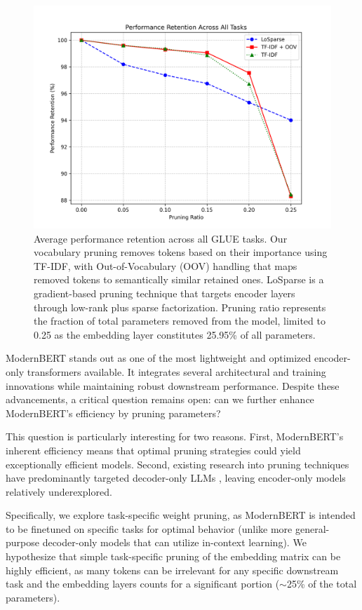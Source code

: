 \documentclass[twocolumn]{article}
\begin{document}
\begin{figure}[t]
\centering
\includegraphics[width=\columnwidth]{images/performance_retention.png}
\caption{Average performance retention across all GLUE tasks. Our vocabulary pruning removes tokens based on their importance using TF-IDF, with Out-of-Vocabulary (OOV) handling that maps removed tokens to semantically similar retained ones. LoSparse is a gradient-based pruning technique that targets encoder layers through low-rank plus sparse factorization. Pruning ratio represents the fraction of total parameters removed from the model, limited to 0.25 as the embedding layer constitutes 25.95\% of all parameters.}
\label{fig:pruning_retention}
\end{figure}

ModernBERT stands out as one of the most lightweight and optimized encoder-only transformers available. It integrates several architectural and training innovations while maintaining robust downstream performance. Despite these advancements, a critical question remains open: can we further enhance ModernBERT's efficiency by pruning parameters?

This question is particularly interesting for two reasons. First, ModernBERT's inherent efficiency means that optimal pruning strategies could yield exceptionally efficient models. Second, existing research into pruning techniques have predominantly targeted decoder-only LLMs \cite{namburi2023llm}, leaving encoder-only models relatively underexplored.

Specifically, we explore task-specific weight pruning, as ModernBERT is intended to be finetuned on specific tasks for optimal behavior (unlike more general-purpose decoder-only models that can utilize in-context learning). We hypothesize that simple task-specific pruning of the embedding matrix can be highly efficient, as many tokens can be irrelevant for any specific downstream task and the embedding layers counts for a significant portion ($\sim$25\% of the total parameters).
\end{document}
